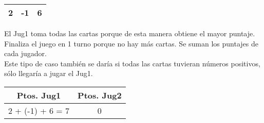 \documentclass[11pt, a4paper, twoside]{article}
\begin{document}
\begin{ejemplo}\hspace{0em}

  \begin{center}
    \begin{tabular}{|c|c|c|}
      \hline
       2 & -1 & 6 \\
      \hline
    \end{tabular} 
  \end{center} 

El Jug1 toma todas las cartas porque de esta manera obtiene el mayor puntaje. \\
Finaliza el juego en 1 turno porque no hay más cartas. Se suman los puntajes de cada jugador.\\
Este tipo de caso también se daría si todas las cartas tuvieran números positivos, sólo llegaría a jugar el Jug1.\\

  \begin{center}
    \begin{tabular}{|c|c|}
      \hline
      Ptos. Jug1 & Ptos. Jug2 \\
      \hline
      2 + (-1) + 6 = 7 & 0 \\
      \hline
    \end{tabular}
  \end{center}  
  
\end{ejemplo}
\end{document}
